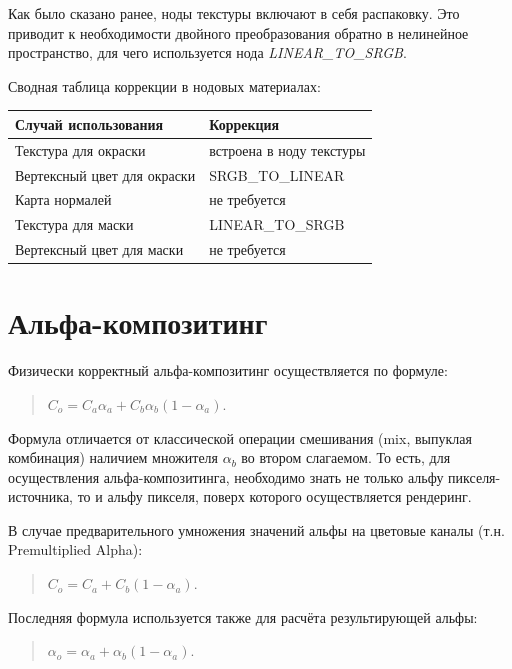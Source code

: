 \documentclass[a4paper,12pt,oneside]{sphinxmanual}
\begin{document}
Как было сказано ранее, ноды текстуры включают в себя распаковку. Это приводит к
необходимости двойного преобразования обратно в нелинейное пространство, для
чего используется нода \emph{LINEAR\_TO\_SRGB}.

Сводная таблица коррекции в нодовых материалах:

\begin{tabulary}{\linewidth}{|L|L|}
\hline
\textsf{\relax 
Случай использования
} & \textsf{\relax 
Коррекция
}\\
\hline
Текстура для окраски
 & 
встроена в ноду текстуры
\\

Вертексный цвет для окраски
 & 
SRGB\_TO\_LINEAR
\\

Карта нормалей
 & 
не требуется
\\

Текстура для маски
 & 
LINEAR\_TO\_SRGB
\\

Вертексный цвет для маски
 & 
не требуется
\\
\hline\end{tabulary}



\section{Альфа-композитинг}
\label{gamma_alpha:id6}
Физически корректный альфа-композитинг осуществляется по формуле:
\begin{quote}

\(C_o = C_a \alpha_a + C_b \alpha_b (1 - \alpha_a)\).
\end{quote}

Формула отличается от классической операции смешивания (mix, выпуклая комбинация) наличием множителя \(\alpha_b\) во втором слагаемом. То есть, для осуществления альфа-композитинга, необходимо знать не только альфу пикселя-источника, то и альфу пикселя, поверх которого осуществляется рендеринг.

В случае предварительного умножения значений альфы на цветовые каналы (т.н.
Premultiplied Alpha):
\begin{quote}

\(C_o = C_a + C_b (1 - \alpha_a)\).
\end{quote}

Последняя формула используется также для расчёта результирующей альфы:
\begin{quote}

\(\alpha_o = \alpha_a + \alpha_b (1 - \alpha_a)\).
\end{quote}
\end{document}

